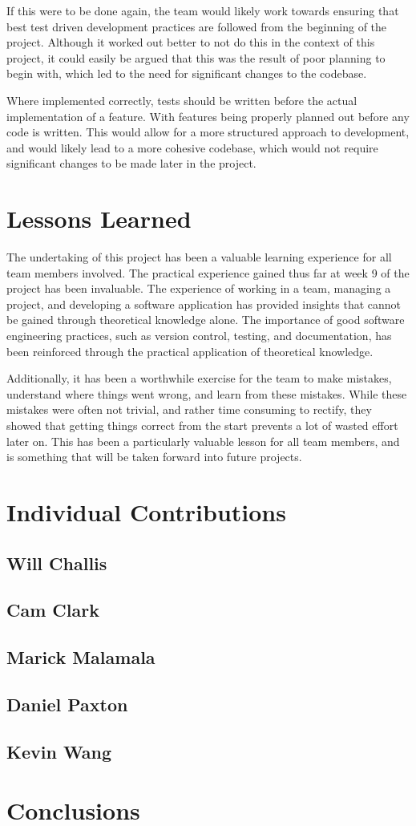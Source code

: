 \documentclass[conference]{IEEEtran}
\begin{document}
If this were to be done again, the team would likely work towards ensuring that best test driven development practices are followed from the beginning of the project. Although it worked out better to not do this in the context of this project, it could easily be argued that this was the result of poor planning to begin with, which led to the need for significant changes to the codebase.

Where implemented correctly, tests should be written before the actual implementation of a feature. With features being properly planned out before any code is written. This would allow for a more structured approach to development, and would likely lead to a more cohesive codebase, which would not require significant changes to be made later in the project.

\section{Lessons Learned}
The undertaking of this project has been a valuable learning experience for all team members involved. The practical experience gained thus far at week 9 of the project has been invaluable. The experience of working in a team, managing a project, and developing a software application has provided insights that cannot be gained through theoretical knowledge alone. The importance of good software engineering practices, such as version control, testing, and documentation, has been reinforced through the practical application of theoretical knowledge. 

Additionally, it has been a worthwhile exercise for the team to make mistakes, understand where things went wrong, and learn from these mistakes. While these mistakes were often not trivial, and rather time consuming to rectify, they showed that getting things correct from the start prevents a lot of wasted effort later on. This has been a particularly valuable lesson for all team members, and is something that will be taken forward into future projects.

\section{Individual Contributions}
\subsection{Will Challis}

\subsection{Cam Clark}

\subsection{Marick Malamala}

\subsection{Daniel Paxton}

\subsection{Kevin Wang}


\section{Conclusions}
\end{document}
